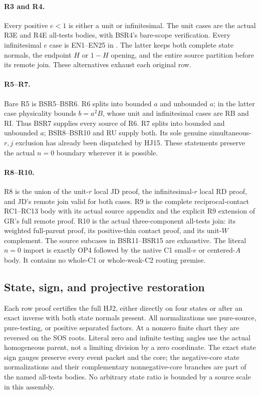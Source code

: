 \paragraph{R3 and R4.}
Every positive \(e<1\) is either a unit or
infinitesimal.  The unit cases are the actual
R3E and R4E all-tests bodies, with BSR4's
bare-scope verification.  Every infinitesimal
\(e\) case is EN1--EN25 in
.
The latter keeps both complete state normals,
the endpoint \(H\) or \(1-H\) opening, and the
entire source partition before its remote join.
These alternatives exhaust each original row.

\paragraph{R5--R7.}
Bare R5 is BSR5--BSR6.
R6 splits into bounded \(a\) and unbounded \(a\);
in the latter case physicality bounds \(b=a^2B\),
whose unit and infinitesimal cases are RB and RI.
Thus BSR7 supplies every source of R6.
R7 splits into bounded and unbounded \(a\);
BSR8--BSR10 and RU supply both.
Its sole genuine simultaneous-\(r,j\) exclusion
has already been dispatched by HJ15.
These statements preserve the actual \(n=0\)
boundary wherever it is possible.

\paragraph{R8--R10.}
R8 is the union of the unit-\(r\) local JD proof,
the infinitesimal-\(r\) local RD proof, and JD's
remote join valid for both cases.
R9 is the complete reciprocal-contact RC1--RC13
body with its actual source appendix and the
explicit R9 extension of GR's full remote proof.
R10 is the actual three-component all-tests join:
its weighted full-parent proof, its positive-thin
contact proof, and its unit-\(W\) complement.
The source subcases in BSR11--BSR15 are exhaustive.
The literal \(n=0\) import is exactly OP4 followed
by the native C1 small-\(e\) or centered-\(A\)
body.  It contains no whole-C1 or whole-weak-C2
routing premise.

\subsection{State, sign, and projective restoration}

Each row proof certifies the full HJ2, either directly
on four states or after an exact inverse with both
state normals present.
All normalizations use pure-source, pure-testing,
or positive separated factors.
At a nonzero finite chart they are reversed on
the SOS roots.  Literal zero and infinite testing
angles use the actual homogeneous parent, not a
limiting division by a zero coordinate.
The exact state sign gauges preserve every event
packet and the core; the negative-core state
normalizations and their complementary
nonnegative-core branches are part of the named
all-tests bodies.
No arbitrary state ratio is bounded by a source
scale in this assembly.

